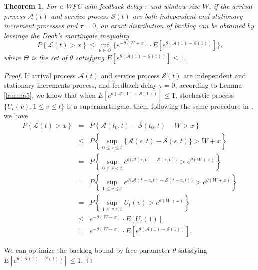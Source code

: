 \documentclass[paper]{ieice}
\newtheorem{theorem}{Theorem}
\newtheorem{proof}{Proof}
\begin{document}
\begin{theorem}\label{theorem3}
For a WFC with feedback delay $\tau$ and window size $W$, if the arrival process $\mathcal{A}(t)$ and service process $\mathcal{S}(t)$ are both independent and stationary increment processes and $\tau=0$, an exact distribution of backlog can be obtained by leverage the Doob's martingale inequality
\begin{equation}\label{eqn3}
P\left\{\mathcal{L}(t)>x\right\}\leq \inf_{\theta\in\Theta}\{e^{-\theta(W+x)}\cdot E[e^{\theta(\mathcal{A}(1)-\mathcal{S}(1))}]\}.
\end{equation}
where $\Theta$ is the set of $\theta$ satisfying $E[e^{\theta(\mathcal{A}(1)-\mathcal{S}(1))}]\leq 1$.
\end{theorem}
\begin{proof}
If arrival process $\mathcal{A}(t)$ and service process $\mathcal{S}(t)$ are independent and stationary increments process, and feedback delay $\tau=0$, according to Lemma \ref{lamma5}, we know that when $E[e^{\theta(\mathcal{A}(1)-\mathcal{S}(1))}]\leq 1$, stochastic process $\{U_{t}(v),1\leq v\leq t\}$ is a supermartingale, then, following the same procedure in \cite{Ciucu2007Network}\cite{jiang2009network}, we have
\begin{eqnarray*}
P\left\{\mathcal{L}(t)>x\right\}  &=&P\left\{\mathcal{A}(t_{0},t)-\mathcal{S}(t_{0},t)-W>x\right\}\\
  &\leq& P\left\{\sup_{0\leq s\leq t}\{\mathcal{A}(s,t)-\mathcal{S}(s,t)\}>W+x\right\}\\
  &=& P\left\{\sup_{0\leq s< t}e^{\theta\{\mathcal{A}(s,t)-\mathcal{S}(s,t)\}}>e^{\theta(W+x)}\right\}\\
  &=& P\left\{\sup_{1\leq v\leq t}e^{\theta\{\mathcal{A}(t-v,t)-\mathcal{S}(t-v,t)\}}>e^{\theta(W+x)}\right\}\\
  &=& P\left\{\sup_{1\leq v\leq t}U_{t}(v)>e^{\theta(W+x)}\right\}\\
  &\leq& e^{-\theta(W+x)}\cdot E[U_{t}(1)]\\
  &=& e^{-\theta(W+x)}\cdot E[e^{\theta(\mathcal{A}(1)-\mathcal{S}(1))}].
\end{eqnarray*}

We can optimize the backlog bound by free parameter $\theta$ satisfying $E[e^{\theta(\mathcal{A}(1)-\mathcal{S}(1))}]\leq 1$.\QED
\end{proof}
\end{document}
